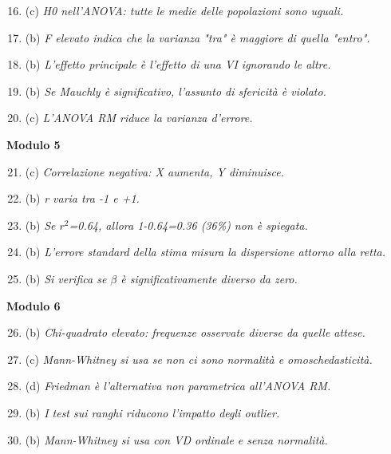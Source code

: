 \documentclass[12pt, a4paper]{article}
\begin{document}
\begin{footnotesize}
\begin{multicols}{3}
\begin{enumerate}
    \setcounter{enumi}{15}
    \item (c) \textit{H0 nell'ANOVA: tutte le medie delle popolazioni sono uguali.}
    \item (b) \textit{F elevato indica che la varianza "tra" è maggiore di quella "entro".}
    \item (b) \textit{L'effetto principale è l'effetto di una VI ignorando le altre.}
    \item (b) \textit{Se Mauchly è significativo, l'assunto di sfericità è violato.}
    \item (c) \textit{L'ANOVA RM riduce la varianza d'errore.}
\end{enumerate}
\vspace{0.5cm}
\textbf{Modulo 5}
\begin{enumerate}
    \setcounter{enumi}{20}
    \item (c) \textit{Correlazione negativa: X aumenta, Y diminuisce.}
    \item (b) \textit{r varia tra -1 e +1.}
    \item (b) \textit{Se $r^2$=0.64, allora 1-0.64=0.36 (36\%) non è spiegata.}
    \item (b) \textit{L'errore standard della stima misura la dispersione attorno alla retta.}
    \item (b) \textit{Si verifica se $\beta$ è significativamente diverso da zero.}
\end{enumerate}
\vspace{0.5cm}
\textbf{Modulo 6}
\begin{enumerate}
    \setcounter{enumi}{25}
    \item (b) \textit{Chi-quadrato elevato: frequenze osservate diverse da quelle attese.}
    \item (c) \textit{Mann-Whitney si usa se non ci sono normalità e omoschedasticità.}
    \item (d) \textit{Friedman è l'alternativa non parametrica all'ANOVA RM.}
    \item (b) \textit{I test sui ranghi riducono l'impatto degli outlier.}
    \item (b) \textit{Mann-Whitney si usa con VD ordinale e senza normalità.}
\end{enumerate}
\end{multicols}
\end{footnotesize}
\end{document}
